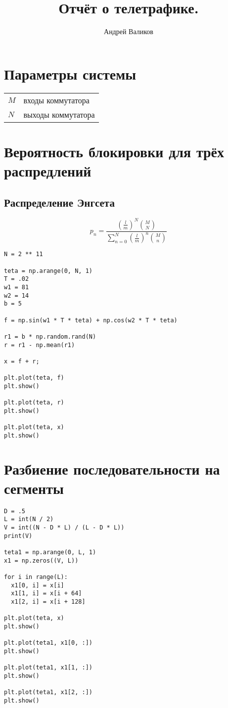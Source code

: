 \documentclass[12pt]{article}
\begin{document}
\title{Отчёт о телетрафике.}
\author{Андрей Валиков}
\date{}
\maketitle

\section{Параметры системы}
\begin{tabular}{l l }
	$M$ & входы коммутатора \\
	$N$ & выходы коммутатора
\end{tabular}
																																																							

\section{Вероятность блокировки для трёх распредлений}

\subsection{Распределение Энгсета}


\[p_n = \frac{\left(\frac{l}{m}\right) ^ N \binom{M}{N}}{\sum_{n=0}^{N} \left(\frac{l}{m}\right) ^ n \binom{M}{n}} \]


\begin{lstlisting}
N = 2 ** 11

teta = np.arange(0, N, 1)
T = .02
w1 = 81
w2 = 14
b = 5

f = np.sin(w1 * T * teta) + np.cos(w2 * T * teta)

r1 = b * np.random.rand(N)
r = r1 - np.mean(r1)

x = f + r;

plt.plot(teta, f)
plt.show()

plt.plot(teta, r)
plt.show()

plt.plot(teta, x)
plt.show()
\end{lstlisting}




\section{Разбиение последовательности на сегменты}




\begin{lstlisting}
D = .5
L = int(N / 2)
V = int((N - D * L) / (L - D * L))
print(V)

teta1 = np.arange(0, L, 1)
x1 = np.zeros((V, L))

for i in range(L):
  x1[0, i] = x[i]
  x1[1, i] = x[i + 64]
  x1[2, i] = x[i + 128]

plt.plot(teta, x)
plt.show()

plt.plot(teta1, x1[0, :])
plt.show()

plt.plot(teta1, x1[1, :])
plt.show()

plt.plot(teta1, x1[2, :])
plt.show()
\end{lstlisting}
\end{document}
